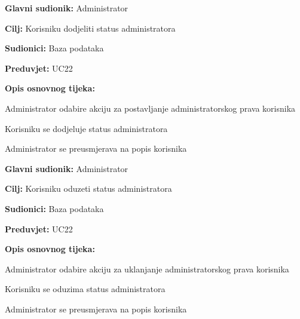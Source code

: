 \noindent {}
\begin{packed_item}
	
	\item \textbf{Glavni sudionik:} Administrator
	\item  \textbf{Cilj:} Korisniku dodjeliti status administratora
	\item  \textbf{Sudionici:} Baza podataka
	\item  \textbf{Preduvjet:} UC22
	\item  \textbf{Opis osnovnog tijeka:}
	
	\item[] \begin{packed_enum}

		\item Administrator odabire akciju za postavljanje administratorskog prava korisnika
		\item Korisniku se dodjeluje status administratora
		\item Administrator se preusmjerava na popis korisnika

	\end{packed_enum}
\end{packed_item}

\noindent {}
\begin{packed_item}
	
	\item \textbf{Glavni sudionik:} Administrator
	\item  \textbf{Cilj:} Korisniku oduzeti status administratora
	\item  \textbf{Sudionici:} Baza podataka
	\item  \textbf{Preduvjet:} UC22
	\item  \textbf{Opis osnovnog tijeka:}
	
	\item[] \begin{packed_enum}

		\item Administrator odabire akciju za uklanjanje administratorskog prava korisnika
		\item Korisniku se oduzima status administratora
		\item Administrator se preusmjerava na popis korisnika

	\end{packed_enum}
\end{packed_item}



